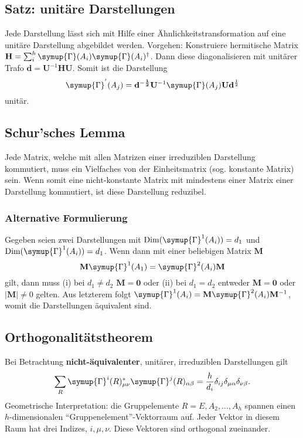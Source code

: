 \documentclass[
  captions=tableheading,  %
  titlepage=firstiscover, %
]{scrartcl}
\begin{document}
\subsection{Satz: unitäre Darstellungen}
Jede Darstellung lässt sich mit Hilfe einer Ähnlichkeitstransformation auf eine 
unitäre Darstellung abgebildet werden. Vorgehen: Konstruiere hermitische Matrix 
${\mathbf{H} = \sum_i^h \symup{\Gamma}(A_i) \symup{\Gamma} (A_i)^\dagger}$. Dann diese diagonalisieren mit unitärer Trafo 
$\mathbf{d} = \mathbf{U}^{-1} \mathbf{H} \mathbf{U}$. Somit ist
die Darstellung 
\begin{equation*}
  \symup{\Gamma}^{'}(A_j) = \mathbf{d^{-\frac{1}{2}}} \mathbf{U}^{-1} \symup{\Gamma}(A_j) \mathbf{U} \mathbf{d}^{\frac{1}{2}}
\end{equation*}
unitär.
\subsection{Schur'sches Lemma}
Jede Matrix, welche mit allen Matrizen einer irreduziblen Darstellung kommutiert,
muss ein Vielfaches von der Einheitsmatrix (sog. konstante Matrix) sein. 
Wenn somit eine nicht-konstante Matrix mit mindestens einer Matrix einer Darstellung kommutiert, 
ist diese Darstellung reduzibel.
\subsubsection{Alternative Formulierung}
Gegeben seien zwei Darstellungen mit $\text{Dim}(\symup{\Gamma}^1(A_i)) = d_1$ und $\text{Dim}(\symup{\Gamma}^1(A_i)) = d_1$.
Wenn dann mit einer beliebigen Matrix $\mathbf{M}$
\begin{equation*}
  \mathbf{M}\symup{\Gamma}^1(A_1) = \symup{\Gamma}^2(A_i) \mathbf{M}
\end{equation*}
gilt, dann muss (i) bei $d_1 \neq d_2$ $\mathbf{M} = \mathbf{0}$ oder (ii) bei $d_1 = d_2$ entweder 
$\mathbf{M} = \mathbf{0}$ oder $|\mathbf{M}| \neq 0$ gelten.
Aus letzterem folgt $\symup{\Gamma}^1(A_i) = \mathbf{M} \symup{\Gamma}^2(A_i) \mathbf{M}^{-1} $, womit 
die Darstellungen äquivalent sind.
\subsection{Orthogonalitätstheorem}
\label{sub:orth}
Bei Betrachtung \textbf{nicht-äquivalenter}, unitärer, irreduziblen Darstellungen gilt
\begin{equation*}
  \sum_R \symup{\Gamma}^i(R)^*_{\mu \nu}\symup{\Gamma}^j(R)_{\alpha \beta} = \frac{h}{d_i} \delta_{ij}\delta_{\mu \alpha}\delta_{\nu \beta}.
\end{equation*}
Geometrische Interpretation: die Gruppelemente $R = E, A_2, \ldots, A_h$ spannen einen 
$h$-dimensionalen \enquote{Gruppenelement}-Vektorraum auf.
Jeder Vektor in diesem Raum hat drei Indizes, $i, \mu, \nu$.
Diese Vektoren sind orthogonal zueinander.
\end{document}

